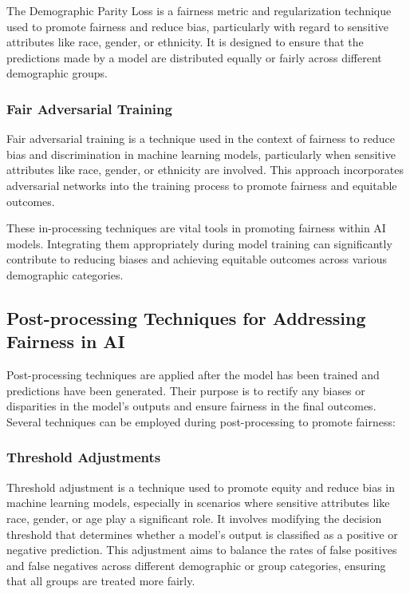 \documentclass[12pt,a4paper,openright,twoside]{book}
\begin{document}
The Demographic Parity Loss is a fairness metric and regularization technique used to promote fairness and reduce bias, particularly with regard to sensitive attributes like race, gender, or ethnicity. It is designed to ensure that the predictions made by a model are distributed equally or fairly across different demographic groups. \cite{jiang2022generalized}

\subsubsection{Fair Adversarial Training}

Fair adversarial training is a technique used in the context of fairness to reduce bias and discrimination in machine learning models, particularly when sensitive attributes like race, gender, or ethnicity are involved. This approach incorporates adversarial networks into the training process to promote fairness and equitable outcomes. \cite{pmlr-v139-xu21b}

These in-processing techniques are vital tools in promoting fairness within AI models. Integrating them appropriately during model training can significantly contribute to reducing biases and achieving equitable outcomes across various demographic categories.

\subsection{Post-processing Techniques for Addressing Fairness in AI}

Post-processing techniques are applied after the model has been trained and predictions have been generated. Their purpose is to rectify any biases or disparities in the model's outputs and ensure fairness in the final outcomes. Several techniques can be employed during post-processing to promote fairness:

\subsubsection{Threshold Adjustments}

Threshold adjustment is a technique used to promote equity and reduce bias in machine learning models, especially in scenarios where sensitive attributes like race, gender, or age play a significant role. It involves modifying the decision threshold that determines whether a model's output is classified as a positive or negative prediction. This adjustment aims to balance the rates of false positives and false negatives across different demographic or group categories, ensuring that all groups are treated more fairly. \cite{10.1145/3447548.3467251}
\end{document}
